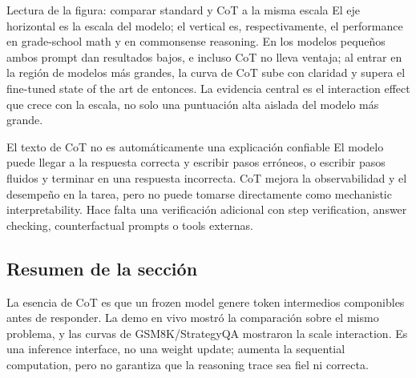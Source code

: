 
\begin{knowledgebox}{Lectura de la figura: comparar standard y CoT a la misma escala}
El eje horizontal es la escala del modelo; el vertical es, respectivamente, el performance en grade-school math y en commonsense reasoning. En los modelos pequeños ambos prompt dan resultados bajos, e incluso CoT no lleva ventaja; al entrar en la región de modelos más grandes, la curva de CoT sube con claridad y supera el fine-tuned state of the art de entonces. La evidencia central es el interaction effect que crece con la escala, no solo una puntuación alta aislada del modelo más grande.
\end{knowledgebox}

\begin{warningbox}{El texto de CoT no es automáticamente una explicación confiable}
El modelo puede llegar a la respuesta correcta y escribir pasos erróneos, o escribir pasos fluidos y terminar en una respuesta incorrecta. CoT mejora la observabilidad y el desempeño en la tarea, pero no puede tomarse directamente como mechanistic interpretability. Hace falta una verificación adicional con step verification, answer checking, counterfactual prompts o tools externas.
\end{warningbox}

\subsection{Resumen de la sección}

La esencia de CoT es que un frozen model genere token intermedios componibles antes de responder. La demo en vivo mostró la comparación sobre el mismo problema, y las curvas de GSM8K/StrategyQA mostraron la scale interaction. Es una inference interface, no una weight update; aumenta la sequential computation, pero no garantiza que la reasoning trace sea fiel ni correcta.
